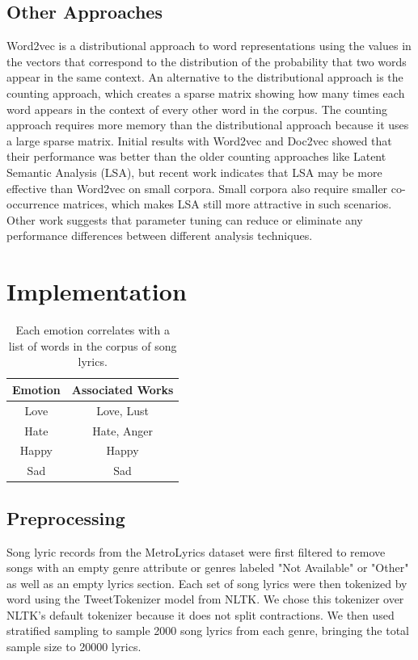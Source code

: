 \documentclass[10pt,twocolumn]{article}
\begin{document}
\subsection{Other Approaches}
Word2vec is a distributional approach to word representations using the values in the vectors that correspond to the distribution of the probability that two words appear in the same context.  An alternative to the distributional approach is the counting approach, which creates a sparse matrix showing how many times each word appears in the context of every other word in the corpus.  The counting approach requires more memory than the distributional approach because it uses a large sparse matrix.  Initial results with Word2vec and Doc2vec showed that their performance was better than the older counting approaches like Latent Semantic Analysis (LSA), but recent work indicates that LSA may be more effective than Word2vec on small corpora. \cite{a10}  Small corpora also require smaller co-occurrence matrices, which makes LSA still more attractive in such scenarios.  Other work suggests that parameter tuning can reduce or eliminate any performance differences between different analysis techniques. \cite{a11}
  
\section{Implementation}


\begin{table}[!hb]
\begin{center}
 \begin{tabular}{ | c | c | } 
 \hline
\textbf{Emotion} & \textbf{Associated Works} \\ [0.5ex] 
 \hline
Love & Love, Lust \\ 
 \hline
Hate & Hate, Anger \\ 
 \hline
Happy & Happy \\ 
 \hline
Sad & Sad \\ 
 \hline
\end{tabular}
\caption{Each emotion correlates with a list of words in the corpus of song lyrics.}
\end{center}
\end{table}

\subsection{Preprocessing}

Song lyric records from the MetroLyrics dataset were first filtered to remove songs with an empty genre attribute or genres labeled "Not Available" or "Other" as well as an empty lyrics section.  Each set of song lyrics were then tokenized by word using the TweetTokenizer model from NLTK.  We chose this tokenizer over NLTK's default tokenizer because it does not split contractions.  We then used stratified sampling to sample 2000 song lyrics from each genre, bringing the total sample size to 20000 lyrics.  
\end{document}
